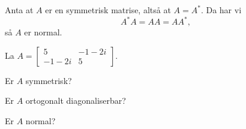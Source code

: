 \begin{losning}
Anta at $A$ er en symmetrisk matrise, altså at $A = A^*$.  Da har vi
\[
A^* A = A A = A A^*,
\]
så $A$ er normal.
\end{losning}


\begin{oppgave}
La 
$
A=
\begin{bmatrix}
5 &-1-2i \\-1-2i & 5
\end{bmatrix}.
$
\begin{punkt}
Er $A$ symmetrisk?
\end{punkt}
\begin{punkt}
Er $A$ ortogonalt diagonaliserbar? 
\end{punkt}
\begin{punkt}
Er $A$ normal?
\end{punkt}
\end{oppgave}


